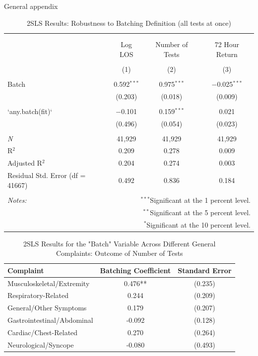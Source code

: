 \documentclass[,,nonblindrev]{informs}
\begin{document}
\begin{APPENDIX}{General appendix}
\newpage

\begin{table}[!htbp] \centering 
  \caption{2SLS Results: Robustness to Batching Definition (all tests at once)} 
  \label{tab:robustness_batching2} 
  
\begin{tabular}{@{\extracolsep{5pt}}lccc} 
\\[-1.8ex]\hline 
\hline \\[-1.8ex] 
\\[-1.8ex] & Log LOS & Number of Tests & 72 Hour Return \\ 
\\[-1.8ex] & (1) & (2) & (3)\\ 
\hline \\[-1.8ex] 
 Batch & 0.592$^{***}$ & 0.975$^{***}$ & $-$0.025$^{***}$ \\ 
  & (0.203) & (0.018) & (0.009) \\ 
  & & & \\ 
 `any.batch(fit)` & $-$0.101 & 0.159$^{***}$ & 0.021 \\ 
  & (0.496) & (0.054) & (0.023) \\ 
  & & & \\ 
\textit{N} & 41,929 & 41,929 & 41,929 \\ 
R$^{2}$ & 0.209 & 0.278 & 0.009 \\ 
Adjusted R$^{2}$ & 0.204 & 0.274 & 0.003 \\ 
Residual Std. Error (df = 41667) & 0.492 & 0.836 & 0.184 \\ 
\hline 
\hline \\[-1.8ex] 
\textit{Notes:} & \multicolumn{3}{r}{$^{***}$Significant at the 1 percent level.} \\ 
 & \multicolumn{3}{r}{$^{**}$Significant at the 5 percent level.} \\ 
 & \multicolumn{3}{r}{$^{*}$Significant at the 10 percent level.} \\ 
\end{tabular} 
\end{table}

\newpage

\begin{table}[ht]
\centering
\caption{2SLS Results for the "Batch" Variable Across Different General Complaints: Outcome of Number of Tests}
\begin{tabular}{lcc}
\hline
\textbf{Complaint} & \textbf{Batching Coefficient} & \textbf{Standard Error} \\
\hline
Musculoskeletal/Extremity & 0.476** & (0.235)  \\
Respiratory-Related & 0.244 & (0.209)   \\
General/Other Symptoms & 0.179 & (0.207)   \\
Gastrointestinal/Abdominal & -0.092 & (0.128)   \\
Cardiac/Chest-Related & 0.270 & (0.264)   \\
Neurological/Syncope & -0.080 & (0.493)   \\
\hline
\end{tabular}
\label{tab:batch_variable_outcome}
\end{table}


\end{APPENDIX}
\end{document}
